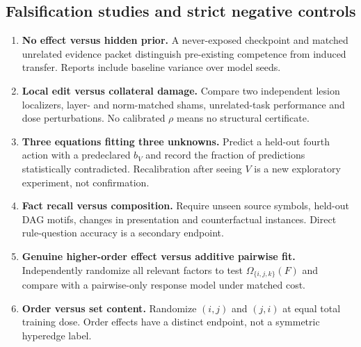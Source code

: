 \documentclass[11pt,a4paper]{article}
\theoremstyle{definition}\newtheorem{definition}[theorem]{Definition}
\theoremstyle{remark}\newtheorem{remark}[theorem]{Remark}
\begin{document}
\subsection{Falsification studies and strict negative controls}
\begin{enumerate}
\item \textbf{No effect versus hidden prior.} A never-exposed checkpoint and matched unrelated evidence packet distinguish pre-existing competence from induced transfer. Reports include baseline variance over model seeds.
\item \textbf{Local edit versus collateral damage.} Compare two independent lesion localizers, layer- and norm-matched shams, unrelated-task performance and dose perturbations. No calibrated $\rho$ means no structural certificate.
\item \textbf{Three equations fitting three unknowns.} Predict a held-out fourth action with a predeclared $b_V$ and record the fraction of predictions statistically contradicted. Recalibration after seeing $V$ is a new exploratory experiment, not confirmation.
\item \textbf{Fact recall versus composition.} Require unseen source symbols, held-out DAG motifs, changes in presentation and counterfactual instances. Direct rule-question accuracy is a secondary endpoint.
\item \textbf{Genuine higher-order effect versus additive pairwise fit.} Independently randomize all relevant factors to test $\Omega_{\{i,j,k\}}(F)$ and compare with a pairwise-only response model under matched cost.
\item \textbf{Order versus set content.} Randomize $(i,j)$ and $(j,i)$ at equal total training dose. Order effects have a distinct endpoint, not a symmetric hyperedge label.
\end{enumerate}
\end{document}
